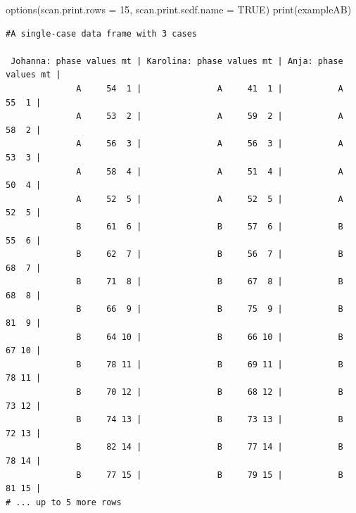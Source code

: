 \documentclass[
]{book}
\newenvironment{Shaded}{\begin{snugshade}}{\end{snugshade}}
\newcommand{\AttributeTok}[1]{\textcolor[rgb]{0.77,0.63,0.00}{#1}}
\newcommand{\ConstantTok}[1]{\textcolor[rgb]{0.00,0.00,0.00}{#1}}
\newcommand{\DecValTok}[1]{\textcolor[rgb]{0.00,0.00,0.81}{#1}}
\newcommand{\FunctionTok}[1]{\textcolor[rgb]{0.00,0.00,0.00}{#1}}
\newcommand{\NormalTok}[1]{#1}
\begin{document}
\begin{Shaded}
\begin{Highlighting}[]
\FunctionTok{options}\NormalTok{(}\AttributeTok{scan.print.rows =} \DecValTok{15}\NormalTok{, }\AttributeTok{scan.print.scdf.name =} \ConstantTok{TRUE}\NormalTok{)}
\FunctionTok{print}\NormalTok{(exampleAB)}
\end{Highlighting}
\end{Shaded}

\begin{verbatim}
#A single-case data frame with 3 cases

 Johanna: phase values mt | Karolina: phase values mt | Anja: phase values mt |
              A     54  1 |               A     41  1 |           A     55  1 |
              A     53  2 |               A     59  2 |           A     58  2 |
              A     56  3 |               A     56  3 |           A     53  3 |
              A     58  4 |               A     51  4 |           A     50  4 |
              A     52  5 |               A     52  5 |           A     52  5 |
              B     61  6 |               B     57  6 |           B     55  6 |
              B     62  7 |               B     56  7 |           B     68  7 |
              B     71  8 |               B     67  8 |           B     68  8 |
              B     66  9 |               B     75  9 |           B     81  9 |
              B     64 10 |               B     66 10 |           B     67 10 |
              B     78 11 |               B     69 11 |           B     78 11 |
              B     70 12 |               B     68 12 |           B     73 12 |
              B     74 13 |               B     73 13 |           B     72 13 |
              B     82 14 |               B     77 14 |           B     78 14 |
              B     77 15 |               B     79 15 |           B     81 15 |
# ... up to 5 more rows
\end{verbatim}
\end{document}
